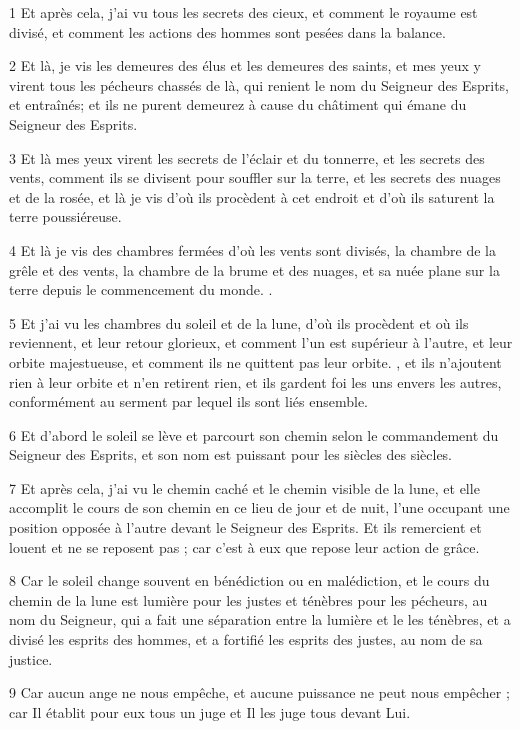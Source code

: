 \par 1 Et après cela, j'ai vu tous les secrets des cieux, et comment le royaume est divisé, et comment les actions des hommes sont pesées dans la balance.
\par 2 Et là, je vis les demeures des élus et les demeures des saints, et mes yeux y virent tous les pécheurs chassés de là, qui renient le nom du Seigneur des Esprits, et entraînés; et ils ne purent demeurez à cause du châtiment qui émane du Seigneur des Esprits.
\par 3 Et là mes yeux virent les secrets de l'éclair et du tonnerre, et les secrets des vents, comment ils se divisent pour souffler sur la terre, et les secrets des nuages ​​et de la rosée, et là je vis d'où ils procèdent à cet endroit et d'où ils saturent la terre poussiéreuse.
\par 4 Et là je vis des chambres fermées d'où les vents sont divisés, la chambre de la grêle et des vents, la chambre de la brume et des nuages, et sa nuée plane sur la terre depuis le commencement du monde. .
\par 5 Et j'ai vu les chambres du soleil et de la lune, d'où ils procèdent et où ils reviennent, et leur retour glorieux, et comment l'un est supérieur à l'autre, et leur orbite majestueuse, et comment ils ne quittent pas leur orbite. , et ils n'ajoutent rien à leur orbite et n'en retirent rien, et ils gardent foi les uns envers les autres, conformément au serment par lequel ils sont liés ensemble.
\par 6 Et d'abord le soleil se lève et parcourt son chemin selon le commandement du Seigneur des Esprits, et son nom est puissant pour les siècles des siècles.
\par 7 Et après cela, j'ai vu le chemin caché et le chemin visible de la lune, et elle accomplit le cours de son chemin en ce lieu de jour et de nuit, l'une occupant une position opposée à l'autre devant le Seigneur des Esprits. Et ils remercient et louent et ne se reposent pas ; car c'est à eux que repose leur action de grâce.
\par 8 Car le soleil change souvent en bénédiction ou en malédiction, et le cours du chemin de la lune est lumière pour les justes et ténèbres pour les pécheurs, au nom du Seigneur, qui a fait une séparation entre la lumière et le les ténèbres, et a divisé les esprits des hommes, et a fortifié les esprits des justes, au nom de sa justice.
\par 9 Car aucun ange ne nous empêche, et aucune puissance ne peut nous empêcher ; car Il établit pour eux tous un juge et Il les juge tous devant Lui.

